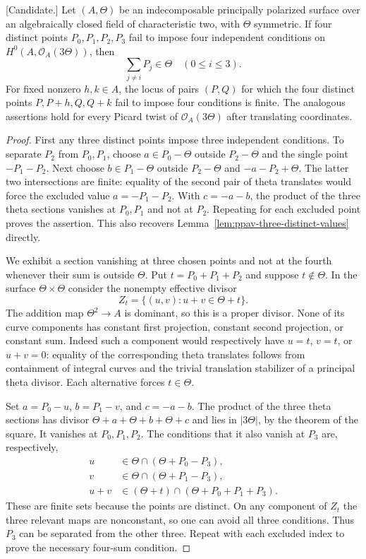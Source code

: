 \begin{lemma}
\label{lem:nonproduct-three-theta-four-values-candidate}
\textup{[Candidate.]}
Let $(A,\Theta)$ be an indecomposable principally polarized surface
over an algebraically closed field of characteristic two, with
$\Theta$ symmetric. If four distinct points $P_0,P_1,P_2,P_3$
fail to impose four independent conditions on
$H^0(A,\mathcal O_A(3\Theta))$, then
\[
                    \sum_{j\ne i}P_j\in\Theta
                           \quad(0\le i\le3).
\]
For fixed nonzero $h,k\in A$, the locus of pairs $(P,Q)$ for which
the four distinct points $P,P+h,Q,Q+k$ fail to impose four
conditions is finite. The analogous assertions hold for every
Picard twist of $\mathcal O_A(3\Theta)$ after translating coordinates.
\end{lemma}
\begin{proof}
First any three distinct points impose three independent conditions.
To separate $P_2$ from $P_0,P_1$, choose
$a\in P_0-\Theta$ outside $P_2-\Theta$ and the single point
$-P_1-P_2$. Next choose $b\in P_1-\Theta$ outside
$P_2-\Theta$ and $-a-P_2+\Theta$. The latter two intersections
are finite: equality of the second pair of theta translates would
force the excluded value $a=-P_1-P_2$. With $c=-a-b$, the product
of the three theta sections vanishes at $P_0,P_1$ and not at $P_2$.
Repeating for each excluded point proves the assertion. This also
recovers Lemma~\ref{lem:ppav-three-distinct-values} directly.

We exhibit a section vanishing at three chosen points and not at
the fourth whenever their sum is outside $\Theta$. Put
$t=P_0+P_1+P_2$ and suppose $t\notin\Theta$. In the surface
$\Theta\times\Theta$ consider the nonempty effective divisor
\[
        Z_t=\{(u,v):u+v\in\Theta+t\}.
\]
The addition map $\Theta^2\to A$ is dominant, so this is a proper
divisor. None of its curve components has constant first projection,
constant second projection, or constant sum. Indeed such a component
would respectively have $u=t$, $v=t$, or $u+v=0$: equality of the
corresponding theta translates follows from containment of integral
curves and the trivial translation stabilizer of a principal theta
divisor. Each alternative forces $t\in\Theta$.

Set $a=P_0-u$, $b=P_1-v$, and $c=-a-b$. The product of the three
theta sections has divisor
$\Theta+a+\Theta+b+\Theta+c$ and lies in $|3\Theta|$, by the
theorem of the square. It vanishes at $P_0,P_1,P_2$.
The conditions that it also vanish at $P_3$ are, respectively,
\[
 \begin{split}
 u&\in\Theta\cap(\Theta+P_0-P_3),\\
 v&\in\Theta\cap(\Theta+P_1-P_3),\\
 u+v&\in(\Theta+t)\cap(\Theta+P_0+P_1+P_3).
 \end{split}
\]
These are finite sets because the points are distinct. On any
component of $Z_t$ the three relevant maps are nonconstant, so
one can avoid all three conditions. Thus $P_3$ can be separated
from the other three. Repeat with each excluded index to prove
the necessary four-sum condition.


\end{proof}

